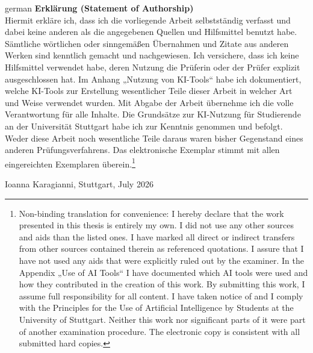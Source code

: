 \documentclass[12pt,leqno,a4paper]{article}
\begin{document}
\begin{otherlanguage}
{german}
\noindent\textbf{Erklärung (Statement of Authorship)}\\


\noindent \noindent Hiermit erkläre ich, dass ich die vorliegende Arbeit selbstständig verfasst und dabei keine anderen als die angegebenen 
Quellen und Hilfsmittel benutzt habe. Sämtliche wörtlichen oder sinngemäßen Übernahmen und Zitate aus anderen Werken sind kenntlich gemacht 
und nachgewiesen. Ich versichere, dass ich keine Hilfsmittel verwendet habe, deren Nutzung die Prüferin oder der Prüfer explizit ausgeschlossen 
hat. Im Anhang „Nutzung von KI-Tools“ habe ich dokumentiert, welche KI-Tools zur Erstellung wesentlicher Teile dieser Arbeit in welcher Art 
und Weise verwendet wurden. Mit Abgabe der Arbeit übernehme ich die volle Verantwortung für alle Inhalte. Die Grundsätze zur KI-Nutzung für 
Studierende an der Universität Stuttgart habe ich zur Kenntnis genommen und befolgt. Weder diese Arbeit noch wesentliche Teile daraus waren 
bisher Gegenstand eines anderen Prüfungsverfahrens. Das elektronische Exemplar stimmt mit allen eingereichten Exemplaren überein.\footnote{Non-binding translation for convenience: I hereby declare that the work presented in this thesis is entirely my own. I did not use any other sources and aids than the listed ones. I have marked all direct or indirect transfers from other sources contained therein as referenced quotations. I assure that I have not used any aids that were explicitly ruled out by the examiner. In the Appendix „Use of AI Tools“ I have documented which AI tools were used and how they contributed in the creation of this work. By submitting this work, I assume full responsibility for all content. I have taken notice of and I comply with the Principles for the Use of Artificial Intelligence by Students at the University of Stuttgart. Neither this work nor significant parts of it were part of another examination procedure. The electronic copy is consistent with all submitted hard copies.}

\end{otherlanguage}
\vspace{2cm}


\noindent Ioanna Karagianni, Stuttgart, July 2026
\end{document}
